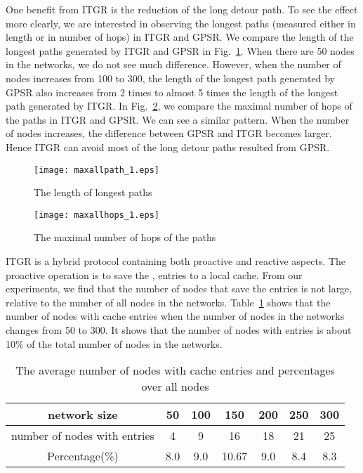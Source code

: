 \documentclass[3p,times]{elsarticle}
\begin{document}
One benefit from ITGR is the reduction of the long detour path. To see the effect more clearly,
we are interested in observing the longest paths (measured either in length or in number of hops)
in ITGR and GPSR.
We compare the length of the longest paths generated
by ITGR and GPSR in Fig.~\ref{fig21}.
When there are 50 nodes in the networks, we do not see much difference. However,
when the number of nodes increases from 100 to 300, the length
of the longest path generated by GPSR also increases from 2 times to almost 5 times
the length of the longest path generated by ITGR.
In Fig.~\ref{fig22}, we compare the maximal number of hops of the paths in ITGR and GPSR.
We can see a similar pattern. When the number of nodes increases,
the difference between GPSR and ITGR becomes larger.
Hence ITGR can avoid most of the long detour paths resulted from GPSR.

\begin{figure}[!htp]
\begin{center}
\texttt{[image: maxallpath\_1.eps]}
\end{center}
\caption{The length of longest paths}
\label{fig21}
\end{figure}

\begin{figure}[!htp]
\begin{center}
\texttt{[image: maxallhops\_1.eps]}
\end{center}
\caption{The maximal number of hops of the paths}
\label{fig22}
\end{figure}



ITGR is a hybrid protocol containing both proactive and reactive aspects. The proactive
operation is to save the  ,   entries to
a local cache.
From our experiments, we find that the number of nodes that save the entries is not large,
relative to the number of all nodes in the networks.
Table~\ref{table3} shows that the number of nodes with cache entries
when the number of nodes in the networks changes
from 50 to 300. It  shows that the number of nodes with entries is about 10\%
of the total number of nodes in the networks.

\begin{table}[ht]
\caption{The average  number of nodes with cache entries and percentages over all nodes}
\centering          \begin{tabular}{c c c c c c c}    \hline\hline                        network size & 50 & 100 & 150 & 200 & 250 & 300 \\ [0.5ex]  \hline                      number of nodes with entries &4&9&16&18&21&25 \\      Percentage(\%)   &8.0&9.0&10.67&9.0&8.4&8.3\\  [1ex]        \hline          \end{tabular}
\label{table3}    \end{table}
\end{document}
